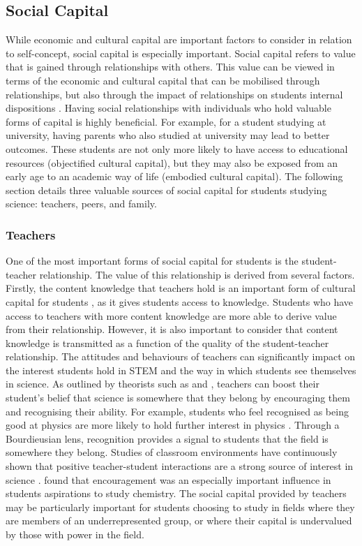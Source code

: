 \subsection*{Social Capital}
While economic and cultural capital are important factors to consider in relation to self-concept, social capital is especially important. Social capital refers to value that is gained through relationships with others. This value can be viewed in terms of the economic and cultural capital that can be mobilised through relationships, but also through the impact of relationships on students internal dispositions \citep{Adler2017}. Having social relationships with individuals who hold valuable forms of capital is highly beneficial. For example, for a student studying at university, having parents who also studied at university may lead to better outcomes. These students are not only more likely to have access to educational resources (objectified cultural capital), but they may also be exposed from an early age to an academic way of life (embodied cultural capital). The following section details three valuable sources of social capital for students studying science: teachers, peers, and family.

\subsubsection*{Teachers}
One of the most important forms of social capital for students is the student-teacher relationship. The value of this relationship is derived from several factors. Firstly, the content knowledge that teachers hold is an important form of cultural capital for students \citep{goldhaber2000does,wayne2003teacher,keller2017impact}, as it gives students access to knowledge. Students who have access to teachers with more content knowledge are more able to derive value from their relationship. However, it is also important to consider that content knowledge is transmitted as a function of the quality of the student-teacher relationship. The attitudes and behaviours of teachers can significantly impact on the interest students hold in STEM \citep{keller2017impact} and the way in which students see themselves in science. As outlined by theorists such as \cite{bandura1986explanatory} and \cite{siegle2007increasing}, teachers can boost their student's belief that science is somewhere that they belong by encouraging them and recognising their ability. For example, students who feel recognised as being good at physics are more likely to hold further interest in physics \citep{Hazari2017}. Through a Bourdieusian lens, recognition provides a signal to students that the field is somewhere they belong. Studies of classroom environments have continuously shown that positive teacher-student interactions are a strong source of interest in science \citep{osborne2003attitudes,keller2017impact}. \cite{mujtaba2018students} found that encouragement was an especially important influence in students aspirations to study chemistry. The social capital provided by teachers may be particularly important for students choosing to study in fields where they are members of an underrepresented group, or where their capital is undervalued by those with power in the field.


